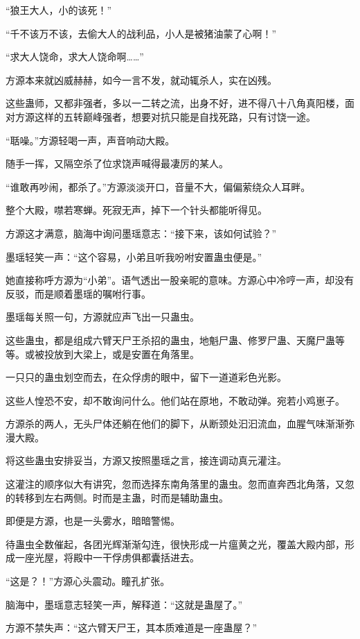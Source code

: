 \begin{this_body}
“狼王大人，小的该死！”

“千不该万不该，去偷大人的战利品，小人是被猪油蒙了心啊！”

“求大人饶命，求大人饶命啊……”

方源本来就凶威赫赫，如今一言不发，就动辄杀人，实在凶残。

这些蛊师，又都非强者，多以一二转之流，出身不好，进不得八十八角真阳楼，面对方源这样的五转巅峰强者，想要对抗只能是自找死路，只有讨饶一途。

“聒噪。”方源轻喝一声，声音响动大殿。

随手一挥，又隔空杀了位求饶声喊得最凄厉的某人。

“谁敢再吵闹，都杀了。”方源淡淡开口，音量不大，偏偏萦绕众人耳畔。

整个大殿，噤若寒蝉。死寂无声，掉下一个针头都能听得见。

方源这才满意，脑海中询问墨瑶意志：“接下来，该如何试验？”

墨瑶轻笑一声：“这个容易，小弟且听我吩咐安置蛊虫便是。”

她直接称呼方源为“小弟”。语气透出一股亲昵的意味。方源心中冷哼一声，却没有反驳，而是顺着墨瑶的嘱咐行事。

墨瑶每关照一句，方源就应声飞出一只蛊虫。

这些蛊虫，都是组成六臂天尸王杀招的蛊虫，地魁尸蛊、修罗尸蛊、天魔尸蛊等等。或被投放到大梁上，或是安置在角落里。

一只只的蛊虫划空而去，在众俘虏的眼中，留下一道道彩色光影。

这些人惶恐不安，却不敢询问什么。他们站在原地，不敢动弹。宛若小鸡崽子。

方源杀的两人，无头尸体还躺在他们的脚下，从断颈处汩汩流血，血腥气味渐渐弥漫大殿。

将这些蛊虫安排妥当，方源又按照墨瑶之言，接连调动真元灌注。

这灌注的顺序似大有讲究，忽而选择东南角落里的蛊虫。忽而直奔西北角落，又忽的转移到左右两侧。时而是主蛊，时而是辅助蛊虫。

即便是方源，也是一头雾水，暗暗警惕。

待蛊虫全数催起，各团光辉渐渐勾连，很快形成一片瘟黄之光，覆盖大殿内部，形成一座光屋，将殿中一干俘虏俱都囊括进去。

“这是？！”方源心头震动。瞳孔扩张。

脑海中，墨瑶意志轻笑一声，解释道：“这就是蛊屋了。”

方源不禁失声：“这六臂天尸王，其本质难道是一座蛊屋？”


\end{this_body}
